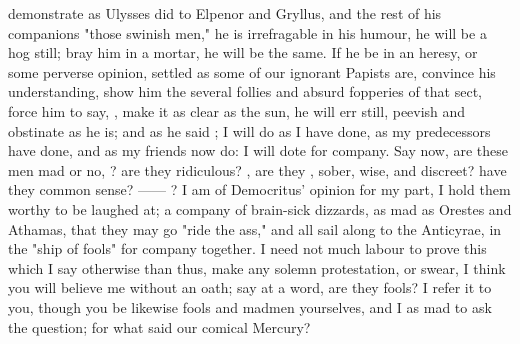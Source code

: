 demonstrate as Ulysses did to Elpenor and Gryllus, and the
rest of his companions "those swinish men," he is irrefragable in his humour,
he will be a hog still; bray him in a mortar, he will be the same. If he be in
an heresy, or some perverse opinion, settled as some of our ignorant Papists
are, convince his understanding, show him the several follies and absurd
fopperies of that sect, force him to say, , make it as clear
as the sun, he will err still, peevish and obstinate as he
is; and as he said ; I will do as I have done, as my predecessors
have done, and as my friends now do: I will dote for
company. Say now, are these men mad or no,
? are they ridiculous? , are they , sober, wise, and discreet? have
they common sense? ------ ? I
am of Democritus' opinion for my part, I hold them worthy to be laughed at; a
company of brain-sick dizzards, as mad as Orestes and
Athamas, that they may go "ride the ass," and all sail along to the Anticyrae,
in the "ship of fools" for company together. I need not much labour to prove
this which I say otherwise than thus, make any solemn protestation, or swear, I
think you will believe me without an oath; say at a word, are they fools? I
refer it to you, though you be likewise fools and madmen yourselves, and I as
mad to ask the question; for what said our comical Mercury?


